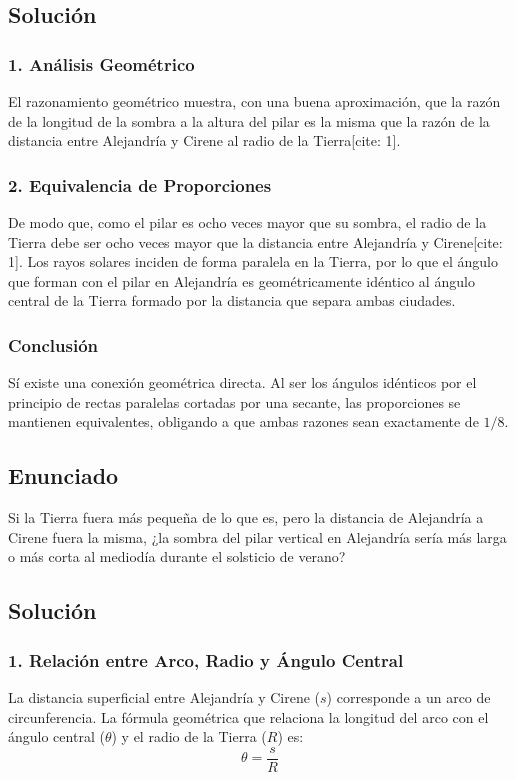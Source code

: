 \documentclass[12pt, a4paper]{article}
\begin{document}
\subsection*{Solución}

\subsubsection*{1. Análisis Geométrico}
El razonamiento geométrico muestra, con una buena aproximación, que la razón de la longitud de la sombra a la altura del pilar es la misma que la razón de la distancia entre Alejandría y Cirene al radio de la Tierra[cite: 1]. 

\subsubsection*{2. Equivalencia de Proporciones}
De modo que, como el pilar es ocho veces mayor que su sombra, el radio de la Tierra debe ser ocho veces mayor que la distancia entre Alejandría y Cirene[cite: 1]. Los rayos solares inciden de forma paralela en la Tierra, por lo que el ángulo que forman con el pilar en Alejandría es geométricamente idéntico al ángulo central de la Tierra formado por la distancia que separa ambas ciudades.

\subsubsection*{Conclusión}
Sí existe una conexión geométrica directa. Al ser los ángulos idénticos por el principio de rectas paralelas cortadas por una secante, las proporciones se mantienen equivalentes, obligando a que ambas razones sean exactamente de $1/8$.

\newpage

\subsection*{Enunciado}
Si la Tierra fuera más pequeña de lo que es, pero la distancia de Alejandría a Cirene fuera la misma, ¿la sombra del pilar vertical en Alejandría sería más larga o más corta al mediodía durante el solsticio de verano?

\subsection*{Solución}

\subsubsection*{1. Relación entre Arco, Radio y Ángulo Central}
La distancia superficial entre Alejandría y Cirene ($s$) corresponde a un arco de circunferencia. La fórmula geométrica que relaciona la longitud del arco con el ángulo central ($\theta$) y el radio de la Tierra ($R$) es:
$$ \theta = \frac{s}{R} $$
\end{document}
